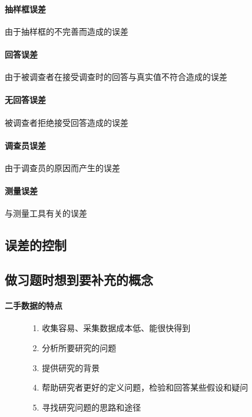 \documentclass[UTF8,10pt]{book}
\begin{document}
    \paragraph{抽样框误差} 由于抽样框的不完善而造成的误差
    \paragraph{回答误差} 由于被调查者在接受调查时的回答与真实值不符合造成的误差
    \paragraph{无回答误差} 被调查者拒绝接受回答造成的误差
    \paragraph{调查员误差} 由于调查员的原因而产生的误差
    \paragraph{测量误差} 与测量工具有关的误差

    \subsection{误差的控制}

    \subsection{做习题时想到要补充的概念}
        \paragraph{二手数据的特点}
            \begin{itemize}
                \item [] {
                    \begin{enumerate}
                        \item [1.] 收集容易、采集数据成本低、能很快得到
                        \item [2.] 分析所要研究的问题
                        \item [3.] 提供研究的背景
                        \item [4.] 帮助研究者更好的定义问题，检验和回答某些假设和疑问
                        \item [5.] 寻找研究问题的思路和途径
                                        
                    \end{enumerate}
                }
            \end{itemize}
\end{document}
